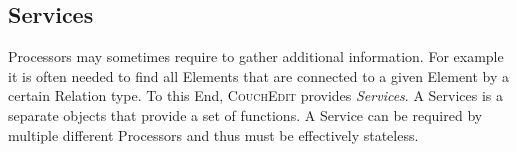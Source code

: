 \subsection{Services}
\label{sec:services}
Processors may sometimes require to gather additional information. For example it is often needed to find all Elements that are connected to a given Element by a certain Relation type. To this End, \textsc{CouchEdit} provides \emph{Services}. A Services is a separate objects that provide a set of functions. A Service can be required by multiple different Processors and thus must be effectively stateless.




